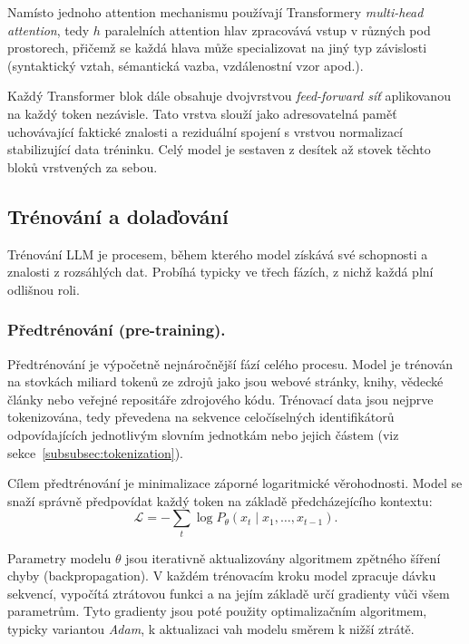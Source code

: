 Namísto jednoho attention mechanismu používají Transformery \textit{multi-head attention}\cite{vaswani-attention}, tedy $h$ paralelních attention hlav zpracovává vstup v různých pod prostorech, přičemž se každá hlava může specializovat na jiný typ závislosti (syntaktický vztah, sémantická vazba, vzdálenostní vzor apod.).

Každý Transformer blok dále obsahuje dvojvrstvou \textit{feed-forward síť} aplikovanou na každý token nezávisle.
Tato vrstva slouží jako adresovatelná paměť uchovávající faktické znalosti a reziduální spojení s vrstvou normalizací stabilizující data tréninku\cite{vaswani-attention}.
Celý model je sestaven z desítek až stovek těchto bloků vrstvených za sebou.

\subsection{Trénování a dolaďování}
\label{subsec:training-fine-tuning}

Trénování LLM je procesem, během kterého model získává své schopnosti a znalosti z rozsáhlých dat.
Probíhá typicky ve třech fázích, z nichž každá plní odlišnou roli.

\subsubsection*{Předtrénování (pre-training).}
Předtrénování je výpočetně nejnáročnější fází celého procesu.
Model je trénován na stovkách miliard tokenů ze zdrojů jako jsou webové stránky, knihy, vědecké články nebo veřejné repositáře zdrojového kódu.
Trénovací data jsou nejprve tokenizována, tedy převedena na sekvence celočíselných identifikátorů odpovídajících jednotlivým slovním jednotkám nebo jejich částem (viz sekce~\ref{subsubsec:tokenization}).

Cílem předtrénování je minimalizace záporné logaritmické věrohodnosti.
Model se snaží správně předpovídat každý token na základě předcházejícího kontextu:
\begin{equation}
    \mathcal{L} = -\sum_{t} \log P_\theta(x_t \mid x_1, \ldots, x_{t-1}). \label{eq:training-loss}
\end{equation}

Parametry modelu $\theta$ jsou iterativně aktualizovány algoritmem zpětného šíření chyby (backpropagation).
V každém trénovacím kroku model zpracuje dávku sekvencí, vypočítá ztrátovou funkci a na jejím základě určí gradienty vůči všem parametrům.
Tyto gradienty jsou poté použity optimalizačním algoritmem, typicky variantou \textit{Adam}, k aktualizaci vah modelu směrem k nižší ztrátě.

